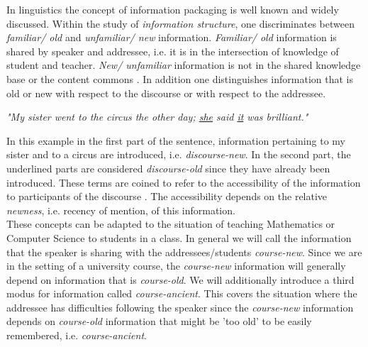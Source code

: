 \documentclass[twoside, 12pt]{article}
\begin{document}
In linguistics the concept of information packaging \cite{CambridgeGrammar:npentrel14} is well known and widely discussed. Within the study of \textit{information structure}, one discriminates between \textit{familiar/ old} and \textit{unfamiliar/ new} information. \textit{Familiar/ old} information is shared by speaker and addressee, i.e. it is in the intersection of knowledge of student and teacher. \textit{New/ unfamiliar} information is not in the shared knowledge base or the content commons \cite{CNX:whitepaper}. In addition one distinguishes information that is old or new with respect to the discourse or with respect to the addressee.

\begin{center}
\textit{"My sister went to the circus the other day; \underline{she} said \underline{it} was brilliant."}\\
\end{center}

In this example in the first part of the sentence, information pertaining to my sister and to a circus are introduced, i.e. \textit{discourse-new}. In the second part, the underlined parts are considered \textit{discourse-old} since they have already been introduced. These terms are coined to refer to the accessibility of the information to participants of the discourse \cite{Newness:npentrel14}. The accessibility depends on the relative \textit{newness}, i.e. recency of mention, of this information.\\

These concepts can be adapted to the situation of teaching Mathematics or Computer Science to students in a class. In general we will call the information that the speaker is sharing with the addressees/students \textit{course-new}. Since we are in the setting of a university course, the \textit{course-new} information will generally depend on information that is \textit{course-old}. We will additionally introduce a third modus for information called \textit{course-ancient}. This covers the situation where the addressee has difficulties following the speaker since the \textit{course-new} information depends on \textit{course-old} information that might be 'too old' to be easily remembered, i.e. \textit{course-ancient}.\\
\end{document}
